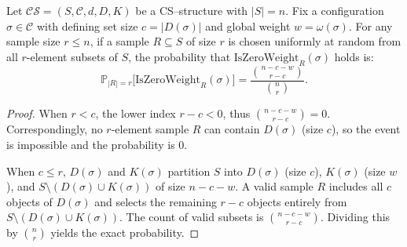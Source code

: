 \begin{lemma}
\label{lem:prob_zero_weight}
Let $\mathcal{CS} = (S, \mathcal{C}, d, D, K)$ be a CS--structure with $|S| = n$. Fix a configuration $\sigma \in \mathcal{C}$ with defining set size $c = |D(\sigma)|$ and global weight $w = \omega(\sigma)$. For any sample size $r \le n$, if a sample $R \subseteq S$ of size $r$ is chosen uniformly at random from all $r$-element subsets of $S$, the probability that $\mathrm{IsZeroWeight}_R(\sigma)$ holds is:
\[
\mathbb{P}_{|R|=r}\big[\mathrm{IsZeroWeight}_R(\sigma)\big] = \frac{\binom{n - c - w}{r - c}}{\binom{n}{r}}.
\]
\end{lemma}
\begin{proof}
\leanok
When $r < c$, the lower index $r - c < 0$, thus $\binom{n - c - w}{r - c} = 0$. Correspondingly, no $r$-element sample $R$ can contain $D(\sigma)$ (size $c$), so the event is impossible and the probability is $0$.

When $c \le r$, $D(\sigma)$ and $K(\sigma)$ partition $S$ into $D(\sigma)$ (size $c$), $K(\sigma)$ (size $w$), and $S \setminus (D(\sigma) \cup K(\sigma))$ of size $n - c - w$. A valid sample $R$ includes all $c$ objects of $D(\sigma)$ and selects the remaining $r - c$ objects entirely from $S \setminus (D(\sigma) \cup K(\sigma))$. The count of valid subsets is $\binom{n - c - w}{r - c}$. Dividing this by $\binom{n}{r}$ yields the exact probability.
\end{proof}

